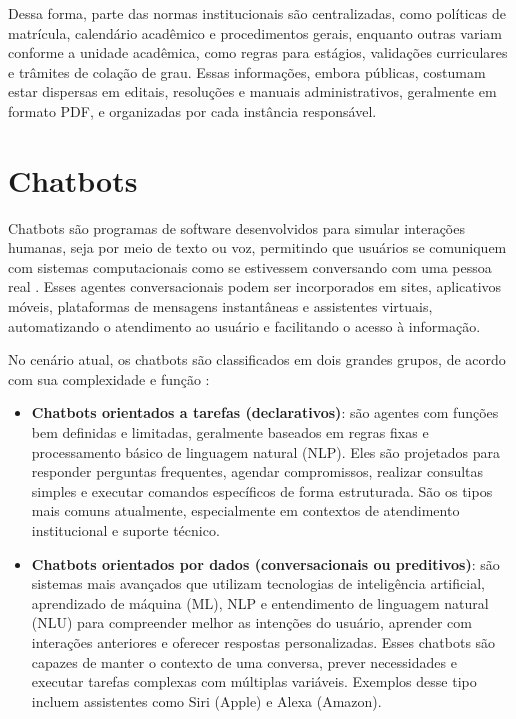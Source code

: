 Dessa forma, parte das normas institucionais são centralizadas, como políticas de matrícula, calendário acadêmico e procedimentos gerais, enquanto outras variam conforme a unidade acadêmica, como regras para estágios, validações curriculares e trâmites de colação de grau. Essas informações, embora públicas, costumam estar dispersas em editais, resoluções e manuais administrativos, geralmente em formato PDF, e organizadas por cada instância responsável.

\section{Chatbots}

Chatbots são programas de software desenvolvidos para simular interações humanas, seja por meio de texto ou voz, permitindo que usuários se comuniquem com sistemas computacionais como se estivessem conversando com uma pessoa real \cite{rouse2018chatbot,aws2025chatbot}. Esses agentes conversacionais podem ser incorporados em sites, aplicativos móveis, plataformas de mensagens instantâneas e assistentes virtuais, automatizando o atendimento ao usuário e facilitando o acesso à informação.

No cenário atual, os chatbots são classificados em dois grandes grupos, de acordo com sua complexidade e função \cite{oracle2025chatbot}:

\begin{itemize}
    \item \textbf{Chatbots orientados a tarefas (declarativos)}: são agentes com funções bem definidas e limitadas, geralmente baseados em regras fixas e processamento básico de linguagem natural (NLP). Eles são projetados para responder perguntas frequentes, agendar compromissos, realizar consultas simples e executar comandos específicos de forma estruturada. São os tipos mais comuns atualmente, especialmente em contextos de atendimento institucional e suporte técnico.
    \item \textbf{Chatbots orientados por dados (conversacionais ou preditivos)}: são sistemas mais avançados que utilizam tecnologias de inteligência artificial, aprendizado de máquina (ML), NLP e entendimento de linguagem natural (NLU) para compreender melhor as intenções do usuário, aprender com interações anteriores e oferecer respostas personalizadas. Esses chatbots são capazes de manter o contexto de uma conversa, prever necessidades e executar tarefas complexas com múltiplas variáveis. Exemplos desse tipo incluem assistentes como Siri (Apple) e Alexa (Amazon).
\end{itemize}

